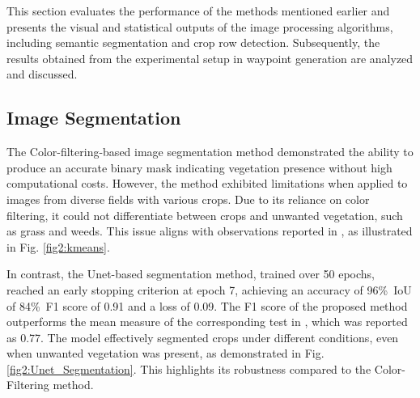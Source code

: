 \documentclass[conference]{IEEEtran}
\begin{document}
	This section evaluates the performance of the methods mentioned earlier and presents the visual and statistical outputs of the image processing algorithms, including semantic segmentation and crop row detection. Subsequently, the results obtained from the experimental setup in waypoint generation are analyzed and discussed.
	\subsection{Image Segmentation}
	
	The Color-filtering-based image segmentation method demonstrated the ability to produce an accurate binary mask indicating vegetation presence without high computational costs. However, the method exhibited limitations when applied to images from diverse fields with various crops. Due to its reliance on color filtering, it could not differentiate between crops and unwanted vegetation, such as grass and weeds. This issue aligns with observations reported in \cite{b5}, as illustrated in Fig.
	\ref{fig2:kmeans}.
	
	
	In contrast, the Unet-based segmentation method, trained over 50 epochs, reached an early stopping criterion at epoch 7, achieving an accuracy of 96\%\, IoU of 84\%\, F1 score of 0.91 and a loss of 0.09. The F1 score of the proposed method outperforms the mean measure of the corresponding test in \cite{b5}, which was reported as 0.77. The model effectively segmented crops under different conditions, even when unwanted vegetation was present, as demonstrated in Fig.
	\ref{fig2:Unet_Segmentation}.
	This highlights its robustness compared to the Color-Filtering method.
	
\end{document}
